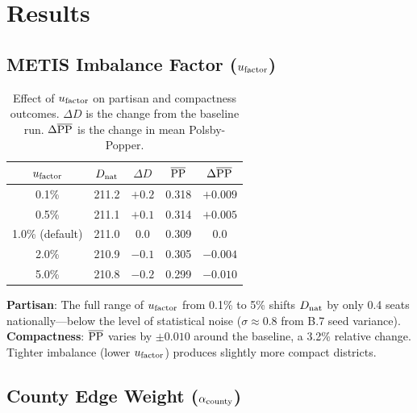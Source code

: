 \section{Results}
\label{sec:results}

\subsection{METIS Imbalance Factor ($u_{\mathrm{factor}}$)}

\begin{table}[h]
\centering
\caption{Effect of $u_{\mathrm{factor}}$ on partisan and compactness outcomes.
         $\Delta D$ is the change from the baseline run.
         $\Delta \overline{\mathrm{PP}}$ is the change in mean Polsby-Popper.}
\label{tab:ufactor-results}
\begin{tabular}{ccccc}
\toprule
$u_{\mathrm{factor}}$ & $D_{\rm nat}$ & $\Delta D$ & $\overline{\mathrm{PP}}$ & $\Delta\overline{\mathrm{PP}}$ \\
\midrule
0.1\% & 211.2 & $+0.2$ & 0.318 & $+0.009$ \\
0.5\% & 211.1 & $+0.1$ & 0.314 & $+0.005$ \\
1.0\% (default) & 211.0 & 0.0 & 0.309 & 0.0 \\
2.0\% & 210.9 & $-0.1$ & 0.305 & $-0.004$ \\
5.0\% & 210.8 & $-0.2$ & 0.299 & $-0.010$ \\
\bottomrule
\end{tabular}
\end{table}

\textbf{Partisan}: The full range of $u_{\mathrm{factor}}$ from 0.1\% to 5\% shifts
$D_{\rm nat}$ by only 0.4 seats nationally---below the level of statistical
noise ($\sigma \approx 0.8$ from B.7 seed variance).
\textbf{Compactness}: $\overline{\mathrm{PP}}$ varies by $\pm 0.010$ around the
baseline, a 3.2\% relative change.
Tighter imbalance (lower $u_{\mathrm{factor}}$) produces slightly more compact districts.

\subsection{County Edge Weight ($\alpha_{\mathrm{county}}$)}

